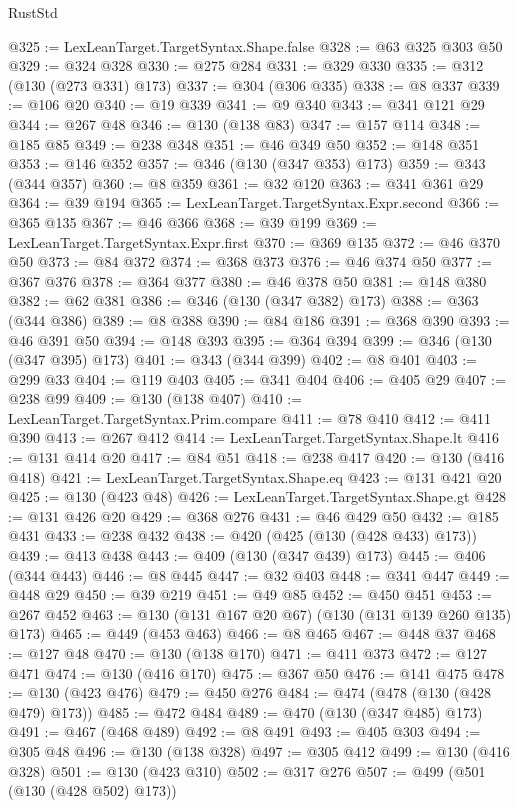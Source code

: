 \begin{lexlean}{RustStd}
\begin{coremodule}
{\begin{coremodule}
{{{{{{{{{{{{{{{{{{{{@325 := LexLeanTarget.TargetSyntax.Shape.false
@328 := @63 @325 @303 @50
@329 := @324 @328
@330 := @275 @284
@331 := @329 @330
@335 := @312 (@130 (@273 @331) @173)
@337 := @304 (@306 @335)
@338 := @8 @337
@339 := @106 @20
@340 := @19 @339
@341 := @9 @340
@343 := @341 @121 @29
@344 := @267 @48
@346 := @130 (@138 @83)
@347 := @157 @114
@348 := @185 @85
@349 := @238 @348
@351 := @46 @349 @50
@352 := @148 @351
@353 := @146 @352
@357 := @346 (@130 (@347 @353) @173)
@359 := @343 (@344 @357)
@360 := @8 @359
@361 := @32 @120
@363 := @341 @361 @29
@364 := @39 @194
@365 := LexLeanTarget.TargetSyntax.Expr.second
@366 := @365 @135
@367 := @46 @366
@368 := @39 @199
@369 := LexLeanTarget.TargetSyntax.Expr.first
@370 := @369 @135
@372 := @46 @370 @50
@373 := @84 @372
@374 := @368 @373
@376 := @46 @374 @50
@377 := @367 @376
@378 := @364 @377
@380 := @46 @378 @50
@381 := @148 @380
@382 := @62 @381
@386 := @346 (@130 (@347 @382) @173)
@388 := @363 (@344 @386)
@389 := @8 @388
@390 := @84 @186
@391 := @368 @390
@393 := @46 @391 @50
@394 := @148 @393
@395 := @364 @394
@399 := @346 (@130 (@347 @395) @173)
@401 := @343 (@344 @399)
@402 := @8 @401
@403 := @299 @33
@404 := @119 @403
@405 := @341 @404
@406 := @405 @29
@407 := @238 @99
@409 := @130 (@138 @407)
@410 := LexLeanTarget.TargetSyntax.Prim.compare
@411 := @78 @410
@412 := @411 @390
@413 := @267 @412
@414 := LexLeanTarget.TargetSyntax.Shape.lt
@416 := @131 @414 @20
@417 := @84 @51
@418 := @238 @417
@420 := @130 (@416 @418)
@421 := LexLeanTarget.TargetSyntax.Shape.eq
@423 := @131 @421 @20
@425 := @130 (@423 @48)
@426 := LexLeanTarget.TargetSyntax.Shape.gt
@428 := @131 @426 @20
@429 := @368 @276
@431 := @46 @429 @50
@432 := @185 @431
@433 := @238 @432
@438 := @420 (@425 (@130 (@428 @433) @173))
@439 := @413 @438
@443 := @409 (@130 (@347 @439) @173)
@445 := @406 (@344 @443)
@446 := @8 @445
@447 := @32 @403
@448 := @341 @447
@449 := @448 @29
@450 := @39 @219
@451 := @49 @85
@452 := @450 @451
@453 := @267 @452
@463 := @130 (@131 @167 @20 @67) (@130 (@131 @139 @260 @135) @173)
@465 := @449 (@453 @463)
@466 := @8 @465
@467 := @448 @37
@468 := @127 @48
@470 := @130 (@138 @170)
@471 := @411 @373
@472 := @127 @471
@474 := @130 (@416 @170)
@475 := @367 @50
@476 := @141 @475
@478 := @130 (@423 @476)
@479 := @450 @276
@484 := @474 (@478 (@130 (@428 @479) @173))
@485 := @472 @484
@489 := @470 (@130 (@347 @485) @173)
@491 := @467 (@468 @489)
@492 := @8 @491
@493 := @405 @303
@494 := @305 @48
@496 := @130 (@138 @328)
@497 := @305 @412
@499 := @130 (@416 @328)
@501 := @130 (@423 @310)
@502 := @317 @276
@507 := @499 (@501 (@130 (@428 @502) @173))
}}}}}}}}}}}}}}}}}}}}
\end{coremodule}}
\end{coremodule}
\end{lexlean}
